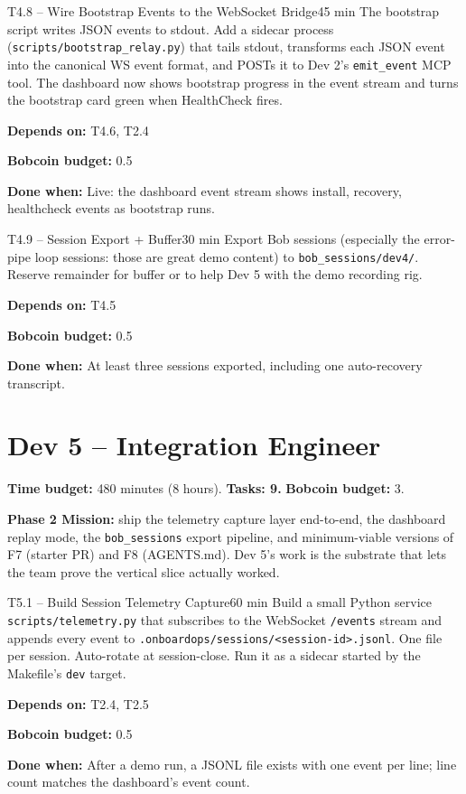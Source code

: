 \documentclass[11pt,letterpaper]{article}
\newcommand{\acceptance}[1]{\par\smallskip\textcolor{ibmgreen}{\textbf{Done when:}} #1}
\newcommand{\depends}[1]{\par\smallskip\textcolor{ibmorange}{\textbf{Depends on:}} #1}
\newcommand{\bobcost}[1]{\par\smallskip\textcolor{ibmaccent}{\textbf{Bobcoin budget:}} #1}
\begin{document}
\begin{task}{T4.8 -- Wire Bootstrap Events to the WebSocket Bridge}{45 min}
The bootstrap script writes JSON events to stdout. Add a sidecar process (\texttt{scripts/bootstrap\_relay.py}) that tails stdout, transforms each JSON event into the canonical WS event format, and POSTs it to Dev 2's \texttt{emit\_event} MCP tool. The dashboard now shows bootstrap progress in the event stream and turns the bootstrap card green when HealthCheck fires.
\depends{T4.6, T2.4}
\bobcost{0.5}
\acceptance{Live: the dashboard event stream shows install, recovery, healthcheck events as bootstrap runs.}
\end{task}

\begin{task}{T4.9 -- Session Export + Buffer}{30 min}
Export Bob sessions (especially the error-pipe loop sessions: those are great demo content) to \texttt{bob\_sessions/dev4/}. Reserve remainder for buffer or to help Dev 5 with the demo recording rig.
\depends{T4.5}
\bobcost{0.5}
\acceptance{At least three sessions exported, including one auto-recovery transcript.}
\end{task}

\section{Dev 5 -- Integration Engineer}

\textbf{Time budget:} 480 minutes (8 hours). \textbf{Tasks: 9.} \textbf{Bobcoin budget:} 3.

\textbf{Phase 2 Mission:} ship the telemetry capture layer end-to-end, the dashboard replay mode, the \texttt{bob\_sessions} export pipeline, and minimum-viable versions of F7 (starter PR) and F8 (AGENTS.md). Dev 5's work is the substrate that lets the team prove the vertical slice actually worked.

\begin{task}{T5.1 -- Build Session Telemetry Capture}{60 min}
Build a small Python service \texttt{scripts/telemetry.py} that subscribes to the WebSocket \texttt{/events} stream and appends every event to \texttt{.onboardops/sessions/<session-id>.jsonl}. One file per session. Auto-rotate at session-close. Run it as a sidecar started by the Makefile's \texttt{dev} target.
\depends{T2.4, T2.5}
\bobcost{0.5}
\acceptance{After a demo run, a JSONL file exists with one event per line; line count matches the dashboard's event count.}
\end{task}
\end{document}
